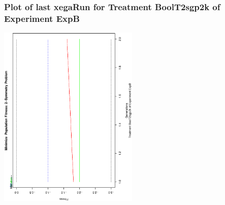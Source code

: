  \begin{frame}
 \frametitle{ Plot of last xegaRun for Treatment BoolT2sgp2k of Experiment ExpB }
 \begin{center}
\includegraphics[width=0.5\textwidth, angle=-90]
{ExpBPlotPopStatsFigure010.eps}
 \end{center}
 \label{report/ExpBPlotPopStatsFigure010.eps}  
 \end{frame}

